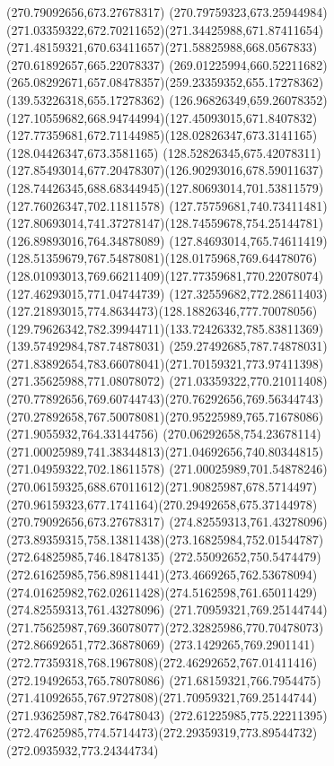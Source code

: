 {{		\moveto(270.79092656,673.27678317)
		\curveto(270.79759323,673.25944984)(271.03359322,672.70211652)(271.34425988,671.87411654)
		\curveto(271.48159321,670.63411657)(271.58825988,668.0567833)(270.61892657,665.22078337)
		\curveto(269.01225994,660.52211682)(265.08292671,657.08478357)(259.23359352,655.17278362)
		\lineto(139.53226318,655.17278362)
		\curveto(126.96826349,659.26078352)(127.10559682,668.94744994)(127.45093015,671.8407832)
		\curveto(127.77359681,672.71144985)(128.02826347,673.3141165)(128.04426347,673.3581165)
		\curveto(128.52826345,675.42078311)(127.85493014,677.20478307)(126.90293016,678.59011637)
		\curveto(128.74426345,688.68344945)(127.80693014,701.53811579)(127.76026347,702.11811578)
		\lineto(127.75759681,740.73411481)
		\curveto(127.80693014,741.37278147)(128.74559678,754.25144781)(126.89893016,764.34878089)
		\curveto(127.84693014,765.74611419)(128.51359679,767.54878081)(128.0175968,769.64478076)
		\curveto(128.01093013,769.66211409)(127.77359681,770.22078074)(127.46293015,771.04744739)
		\curveto(127.32559682,772.28611403)(127.21893015,774.8634473)(128.18826346,777.70078056)
		\curveto(129.79626342,782.39944711)(133.72426332,785.83811369)(139.57492984,787.74878031)
		\lineto(259.27492685,787.74878031)
		\curveto(271.83892654,783.66078041)(271.70159321,773.97411398)(271.35625988,771.08078072)
		\curveto(271.03359322,770.21011408)(270.77892656,769.60744743)(270.76292656,769.56344743)
		\curveto(270.27892658,767.50078081)(270.95225989,765.71678086)(271.9055932,764.33144756)
		\curveto(270.06292658,754.23678114)(271.00025989,741.38344813)(271.04692656,740.80344815)
		\lineto(271.04959322,702.18611578)
		\curveto(271.00025989,701.54878246)(270.06159325,688.67011612)(271.90825987,678.5714497)
		\curveto(270.96159323,677.1741164)(270.29492658,675.37144978)(270.79092656,673.27678317)
		\moveto(274.82559313,761.43278096)
		\curveto(273.89359315,758.13811438)(273.16825984,752.01544787)(272.64825985,746.18478135)
		\curveto(272.55092652,750.5474479)(272.61625985,756.89811441)(273.4669265,762.53678094)
		\curveto(274.01625982,762.02611428)(274.5162598,761.65011429)(274.82559313,761.43278096)
		\moveto(271.70959321,769.25144744)
		\curveto(271.75625987,769.36078077)(272.32825986,770.70478073)(272.86692651,772.36878069)
		\lineto(273.1429265,769.2901141)
		\curveto(272.77359318,768.1967808)(272.46292652,767.01411416)(272.19492653,765.78078086)
		\curveto(271.68159321,766.7954475)(271.41092655,767.9727808)(271.70959321,769.25144744)
		\moveto(271.93625987,782.76478043)
		\lineto(272.61225985,775.22211395)
		\curveto(272.47625985,774.5714473)(272.29359319,773.89544732)(272.0935932,773.24344734)
}}
